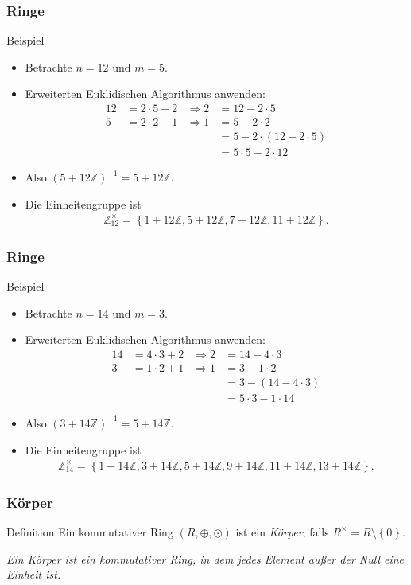 \documentclass{beamer}
\renewcommand{\emph}[1]{{\textcolor{solarizedRed}{\itshape #1}}}
\newcommand\ZZ{\mathbb Z}
\newcommand\cbc[1]{\left\{{#1}\right\}}
\renewcommand{\oe}{\"o}
\renewcommand{\otimes}{\odot}
\begin{document}
\begin{frame}\frametitle{Ringe}
	\begin{block}{Beispiel}
		\begin{itemize}
			\item Betrachte $n=12$ und $m=5$.
			\item Erweiterten Euklidischen Algorithmus anwenden:
				\begin{align*}
					12&=2\cdot 5+2&\Rightarrow2&=12-2\cdot 5\\
					5&=2\cdot 2+1&\Rightarrow1&=5-2\cdot 2\\&&&=5-2\cdot(12-2\cdot 5)\\&&&=5\cdot 5-2\cdot 12
				\end{align*}
			\item Also $(5+12\ZZ)^{-1}=5+12\ZZ$.
			\item Die Einheitengruppe ist 
				\begin{align*}
					\ZZ_{12}^\times=\cbc{1+12\ZZ,5+12\ZZ,7+12\ZZ,11+12\ZZ}.
				\end{align*}
		\end{itemize}
	\end{block}
\end{frame}

\begin{frame}\frametitle{Ringe}
	\begin{block}{Beispiel}
		\begin{itemize}
			\item Betrachte $n=14$ und $m=3$.
			\item Erweiterten Euklidischen Algorithmus anwenden:
				\begin{align*}
					14&=4\cdot 3+2&\Rightarrow2&=14-4\cdot 3\\
					3&=1\cdot 2+1&\Rightarrow1&=3-1\cdot 2\\&&&=3-(14-4\cdot 3)\\&&&=5\cdot 3-1\cdot 14
				\end{align*}
			\item Also $(3+14\ZZ)^{-1}=5+14\ZZ$.
			\item Die Einheitengruppe ist 
				\begin{align*}
					\ZZ_{14}^\times=\cbc{1+14\ZZ,3+14\ZZ,5+14\ZZ,9+14\ZZ,11+14\ZZ,13+14\ZZ}.
				\end{align*}
		\end{itemize}
	\end{block}
\end{frame}

\begin{frame}\frametitle{K\oe rper}
	\begin{block}{Definition}
		Ein kommutativer Ring $(R,\oplus,\otimes)$ ist ein \emph{K\oe rper}, falls $R^\times=R\setminus\cbc 0.$
	\end{block}
	\begin{block}{}
		\itshape Ein K\oe rper ist ein kommutativer Ring, in dem jedes Element au\ss er der Null eine Einheit ist.
	\end{block}
\end{frame}
\end{document}
